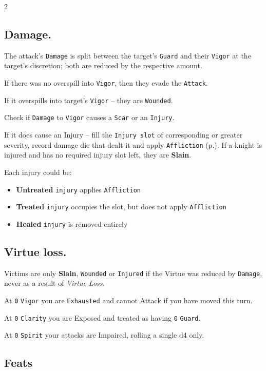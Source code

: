 \documentclass{osr-template/zine}
\begin{document}
\begin{multicols*}{2}
\label{sec:combat}
\subsection*{Damage.}
\label{sec:wounded}

The attack’s \texttt{Damage} is split between the
target’s \texttt{Guard} and their \texttt{Vigor} at the target's discretion; both are reduced by the respective amount.

If there was no overspill into \texttt{Vigor}, then they evade the \texttt{Attack}.

If it overspills into target’s \texttt{Vigor} -- they are \texttt{Wounded}.

Check if \texttt{Damage} to \texttt{Vigor} causes a \texttt{Scar} or an \texttt{Injury}.

If it does cause an Injury -- fill the \texttt{Injury slot} of corresponding or greater severity, record damage die that dealt it and apply \texttt{Affliction} (p.\pageref*{sec:affliction}).
If a knight is injured and has no required injury slot left, they are \textbf{Slain}.

Each injury could be:
\begin{itemize}[nosep]
    \item \textbf{Untreated} \texttt{injury} applies \texttt{Affliction}
    \item \textbf{Treated} \texttt{injury} occupies the slot, but does not apply \texttt{Affliction}
    \item \textbf{Healed} \texttt{injury} is removed entirely
\end{itemize}


\subsection*{Virtue loss.}

Victims are only \textbf{Slain}, \texttt{Wounded} or \texttt{Injured} if the Virtue was reduced by \texttt{Damage}, never as a result of \emph{Virtue Loss}.

At \texttt{0} \texttt{Vigor} you are \texttt{Exhausted} and cannot Attack if you have moved this turn.

At \texttt{0} \texttt{Clarity} you are Exposed and treated as having \texttt{0} \texttt{Guard}.

At \texttt{0} \texttt{Spirit} your attacks are Impaired, rolling a single d4 only.

\subsection*{Feats}


\end{multicols*}
\end{document}
